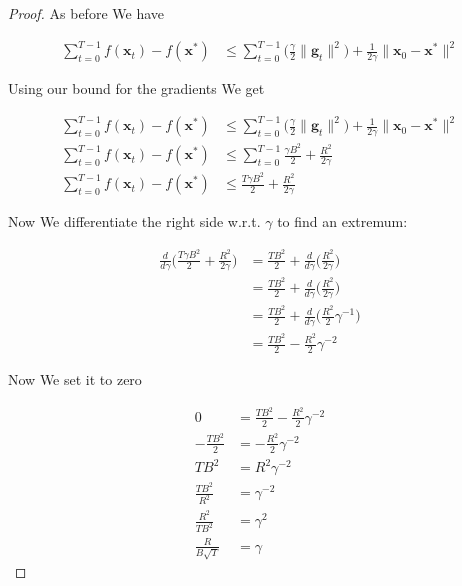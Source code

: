 \documentclass{article}
\begin{document}
	\begin{proof}
		As before We have
		
		\begin{align*}
			\sum^{T-1}_{t=0}f(\mathbf{x}_t) - f(\mathbf{x}^*) &\le \sum^{T-1}_{t=0} \bigg(  \frac{\gamma}{2} \|\mathbf{g}_t\|^2\bigg) + \frac{1}{2\gamma} \|\mathbf{x}_0 - \mathbf{x}^*\|^2
		\end{align*}
	
		Using our bound for the gradients We get
		
		\begin{align*}
			\sum^{T-1}_{t=0}f(\mathbf{x}_t) - f(\mathbf{x}^*) &\le \sum^{T-1}_{t=0} \bigg(  \frac{\gamma}{2} \|\mathbf{g}_t\|^2\bigg) + \frac{1}{2\gamma} \|\mathbf{x}_0 - \mathbf{x}^*\|^2\\
			\sum^{T-1}_{t=0}f(\mathbf{x}_t) - f(\mathbf{x}^*) &\le \sum^{T-1}_{t=0}  \frac{\gamma B^2}{2}  + \frac{R^2}{2\gamma} \\
			\sum^{T-1}_{t=0}f(\mathbf{x}_t) - f(\mathbf{x}^*) &\le  \frac{T \gamma B^2}{2}  + \frac{R^2}{2\gamma} 
		\end{align*}
		
		Now We differentiate the right side w.r.t. $\gamma$ to find an extremum:
		
		\begin{align*}
			\frac{d}{d\gamma} \bigg(\frac{T \gamma B^2}{2}  + \frac{R^2}{2\gamma}\bigg) &=  \frac{T B^2}{2}  + \frac{d}{d\gamma} \bigg( \frac{R^2}{2\gamma}\bigg)\\
			&=  \frac{T B^2}{2}  + \frac{d}{d\gamma} \bigg( \frac{R^2}{2\gamma}\bigg)\\
			&=  \frac{T B^2}{2}  + \frac{d}{d\gamma} \bigg( \frac{R^2}{2} \gamma^{-1}\bigg)\\
			&=  \frac{T B^2}{2}  - \frac{R^2}{2} \gamma^{-2}
		\end{align*}
		
		Now We set it to zero
		
		\begin{align*}
			0 &=  \frac{T B^2}{2}  - \frac{R^2}{2} \gamma^{-2} \\
			- \frac{T B^2}{2}  &=   - \frac{R^2}{2} \gamma^{-2}\\
			T B^2  &=  R^2 \gamma^{-2}\\
			\frac{T B^2}{R^2}  &= \gamma^{-2}\\
			\frac{R^2}{T B^2}  &= \gamma^{2}\\
			\frac{R}{B\sqrt{T} }  &= \gamma
		\end{align*}
		

\end{proof}
\end{document}
